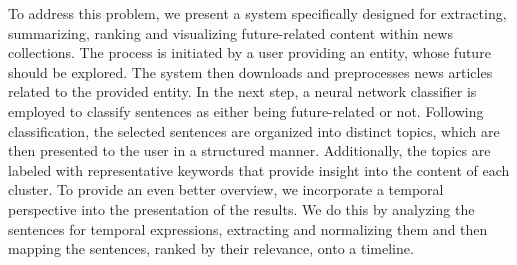 \documentclass[sigconf]{acmart}
\begin{document}
To address this problem, we present a system specifically designed for extracting, summarizing, ranking and visualizing future-related content within news collections. The process is initiated by a user providing an entity, whose future should be explored. The system then downloads and preprocesses news articles related to the provided entity. In the next step, a neural network classifier is employed to classify sentences as either being future-related or not. Following classification, the selected sentences are organized into distinct topics, which are then presented to the user in a structured manner. Additionally, the topics are labeled with representative keywords that provide insight into the content of each cluster. To provide an even better overview, we incorporate a temporal perspective into the presentation of the results. We do this by analyzing the sentences for temporal expressions, extracting and normalizing them and then mapping the sentences, ranked by their relevance, onto a timeline.

\end{document}
